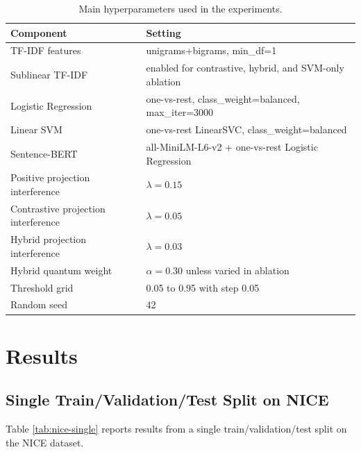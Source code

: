 \documentclass[runningheads]{llncs}
\begin{document}
\begin{table}[htbp]
\centering
\caption{Main hyperparameters used in the experiments.}
\label{tab:hyperparameters}
\begin{tabular}{ll}
\toprule
Component & Setting \\
\midrule
TF-IDF features & unigrams+bigrams, min\_df=1 \\
Sublinear TF-IDF & enabled for contrastive, hybrid, and SVM-only ablation \\
Logistic Regression & one-vs-rest, class\_weight=balanced, max\_iter=3000 \\
Linear SVM & one-vs-rest LinearSVC, class\_weight=balanced \\
Sentence-BERT & all-MiniLM-L6-v2 + one-vs-rest Logistic Regression \\
Positive projection interference & $\lambda=0.15$ \\
Contrastive projection interference & $\lambda=0.05$ \\
Hybrid projection interference & $\lambda=0.03$ \\
Hybrid quantum weight & $\alpha=0.30$ unless varied in ablation \\
Threshold grid & 0.05 to 0.95 with step 0.05 \\
Random seed & 42 \\
\bottomrule
\end{tabular}
\end{table}

\section{Results}
\subsection{Single Train/Validation/Test Split on NICE}
Table \ref{tab:nice-single} reports results from a single
train/validation/test split on the NICE dataset.
\end{document}
